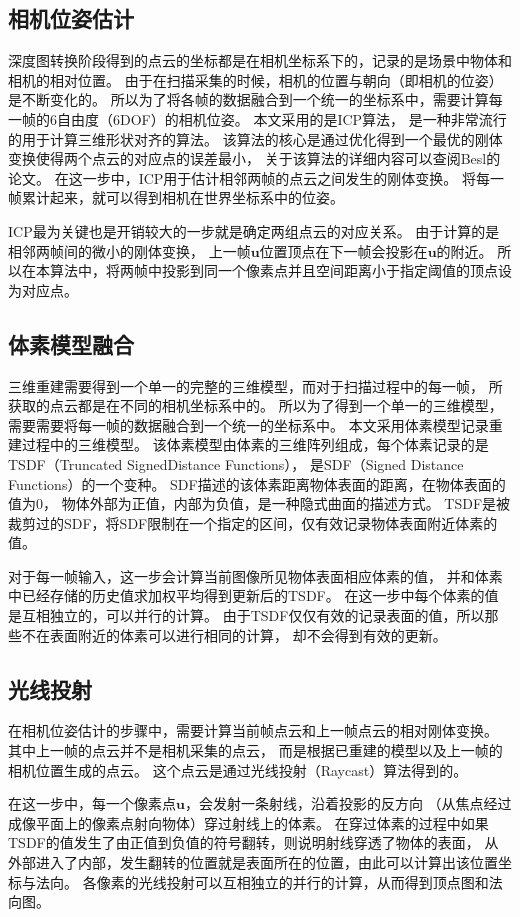 \subsection{相机位姿估计}
深度图转换阶段得到的点云的坐标都是在相机坐标系下的，记录的是场景中物体和相机的相对位置。
由于在扫描采集的时候，相机的位置与朝向（即相机的位姿）是不断变化的。
所以为了将各帧的数据融合到一个统一的坐标系中，需要计算每一帧的6自由度（6DOF）的相机位姿。
本文采用的是ICP算法\cite{besl1992method}，
是一种非常流行的用于计算三维形状对齐的算法。
该算法的核心是通过优化得到一个最优的刚体变换使得两个点云的对应点的误差最小，
关于该算法的详细内容可以查阅Besl的论文\cite{besl1992method}。
在这一步中，ICP用于估计相邻两帧的点云之间发生的刚体变换。
将每一帧累计起来，就可以得到相机在世界坐标系中的位姿。

ICP最为关键也是开销较大的一步就是确定两组点云的对应关系。
由于计算的是相邻两帧间的微小的刚体变换，
上一帧$\bm{u}$位置顶点在下一帧会投影在$\bm{u}$的附近。
所以在本算法中，将两帧中投影到同一个像素点并且空间距离小于指定阈值的顶点设为对应点。

\subsection{体素模型融合}

三维重建需要得到一个单一的完整的三维模型，而对于扫描过程中的每一帧，
所获取的点云都是在不同的相机坐标系中的。
所以为了得到一个单一的三维模型，需要需要将每一帧的数据融合到一个统一的坐标系中。
本文采用体素模型记录重建过程中的三维模型。
该体素模型由体素的三维阵列组成，每个体素记录的是TSDF（Truncated SignedDistance Functions），
是SDF（Signed Distance Functions）的一个变种。
SDF描述的该体素距离物体表面的距离，在物体表面的值为0，
物体外部为正值，内部为负值，是一种隐式曲面的描述方式。
TSDF是被裁剪过的SDF，将SDF限制在一个指定的区间，仅有效记录物体表面附近体素的值。

对于每一帧输入，这一步会计算当前图像所见物体表面相应体素的值，
并和体素中已经存储的历史值求加权平均得到更新后的TSDF。
在这一步中每个体素的值是互相独立的，可以并行的计算。
由于TSDF仅仅有效的记录表面的值，所以那些不在表面附近的体素可以进行相同的计算，
却不会得到有效的更新。

\subsection{光线投射}

在相机位姿估计的步骤中，需要计算当前帧点云和上一帧点云的相对刚体变换。
其中上一帧的点云并不是相机采集的点云，
而是根据已重建的模型以及上一帧的相机位置生成的点云。
这个点云是通过光线投射（Raycast）算法得到的。

在这一步中，每一个像素点$\bm{u}$，会发射一条射线，沿着投影的反方向
（从焦点经过成像平面上的像素点射向物体）穿过射线上的体素。
在穿过体素的过程中如果TSDF的值发生了由正值到负值的符号翻转，则说明射线穿透了物体的表面，
从外部进入了内部，发生翻转的位置就是表面所在的位置，由此可以计算出该位置坐标与法向。
各像素的光线投射可以互相独立的并行的计算，从而得到顶点图和法向图。

